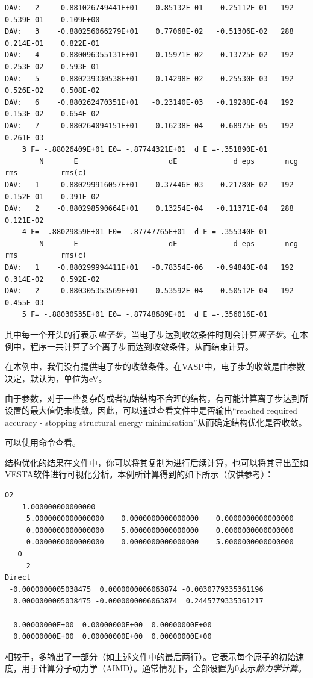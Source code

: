 \begin{lstlisting}[caption=OSZICAR,basicstyle=\tiny]
DAV:   2    -0.881026749441E+01    0.85132E-01   -0.25112E-01   192   0.539E-01    0.109E+00
DAV:   3    -0.880256066279E+01    0.77068E-02   -0.51306E-02   288   0.214E-01    0.822E-01
DAV:   4    -0.880096355131E+01    0.15971E-02   -0.13725E-02   192   0.253E-02    0.593E-01
DAV:   5    -0.880239330538E+01   -0.14298E-02   -0.25530E-03   192   0.526E-02    0.508E-02
DAV:   6    -0.880262470351E+01   -0.23140E-03   -0.19288E-04   192   0.153E-02    0.654E-02
DAV:   7    -0.880264094151E+01   -0.16238E-04   -0.68975E-05   192   0.261E-03
    3 F= -.88026409E+01 E0= -.87744321E+01  d E =-.351890E-01
        N       E                     dE             d eps       ncg     rms          rms(c)
DAV:   1    -0.880299916057E+01   -0.37446E-03   -0.21780E-02   192   0.152E-01    0.391E-02
DAV:   2    -0.880298590664E+01    0.13254E-04   -0.11371E-04   288   0.121E-02
    4 F= -.88029859E+01 E0= -.87747765E+01  d E =-.355340E-01
        N       E                     dE             d eps       ncg     rms          rms(c)
DAV:   1    -0.880299994411E+01   -0.78354E-06   -0.94840E-04   192   0.314E-02    0.592E-02
DAV:   2    -0.880305353569E+01   -0.53592E-04   -0.50512E-04   192   0.455E-03
    5 F= -.88030535E+01 E0= -.87748689E+01  d E =-.356016E-01    
\end{lstlisting}

其中每一个开头的行表示\emph{电子步}，当电子步达到收敛条件时则会计算\emph{离子步}。在本例中，程序一共计算了5个离子步而达到收敛条件，从而结束计算。

\begin{extend}
    在本例中，我们没有提供电子步的收敛条件。在VASP中，电子步的收敛是由参数决定，默认为，单位为eV。
\end{extend}

\begin{attention}
    由于参数，对于一些复杂的或者初始结构不合理的结构，有可能计算离子步达到所设置的最大值仍未收敛。因此，可以通过查看文件中是否输出“reached required accuracy - stopping structural energy minimisation”从而确定结构优化是否收敛。

    可以使用命令查看。
\end{attention}

结构优化的结果在文件中，你可以将其复制为进行后续计算，也可以将其导出至如VESTA软件进行可视化分析。本例所计算得到的如下所示（仅供参考）：

\begin{lstlisting}[caption=CONTCAR]
O2                                      
    1.000000000000000     
     5.0000000000000000    0.0000000000000000    0.0000000000000000
     0.0000000000000000    5.0000000000000000    0.0000000000000000
     0.0000000000000000    0.0000000000000000    5.0000000000000000
   O 
     2
Direct
 -0.0000000005038475  0.0000000006063874 -0.0030779335361196
  0.0000000005038475 -0.0000000006063874  0.2445779335361217
 
  0.00000000E+00  0.00000000E+00  0.00000000E+00
  0.00000000E+00  0.00000000E+00  0.00000000E+00
\end{lstlisting}

\begin{extend}
    相较于，多输出了一部分（如上述文件中的最后两行）。它表示每个原子的初始速度，用于计算分子动力学（AIMD）。通常情况下，全部设置为0表示\emph{静力学计算}。
\end{extend}